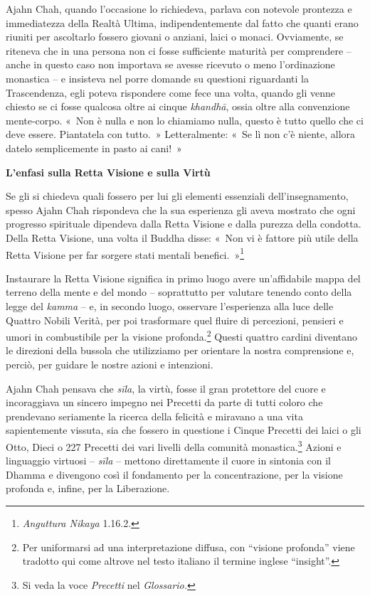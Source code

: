 Ajahn Chah, quando l'occasione lo richiedeva, parlava con notevole
prontezza e immediatezza della Realtà Ultima, indipendentemente dal
fatto che quanti erano riuniti per ascoltarlo fossero giovani o anziani,
laici o monaci. Ovviamente, se riteneva che in una persona non ci fosse
sufficiente maturità per comprendere -- anche in questo caso non
importava se avesse ricevuto o meno l'ordinazione monastica -- e
insisteva nel porre domande su questioni riguardanti la Trascendenza,
egli poteva rispondere come fece una volta, quando gli venne chiesto se
ci fosse qualcosa oltre ai cinque \emph{khandhā}, ossia oltre alla
convenzione mente-corpo. «~Non è nulla e non lo chiamiamo nulla, questo
è tutto quello che ci deve essere. Piantatela con tutto.~»
Letteralmente: «~Se lì non c'è niente, allora datelo semplicemente in
pasto ai cani!~»

\textbf{L'enfasi sulla Retta Visione e sulla Virtù}

Se gli si chiedeva quali fossero per lui gli elementi essenziali
dell'insegnamento, spesso Ajahn Chah rispondeva che la sua esperienza
gli aveva mostrato che ogni progresso spirituale dipendeva dalla Retta
Visione e dalla purezza della condotta. Della Retta Visione, una volta
il Buddha disse: «~Non vi è fattore più utile della Retta Visione per
far sorgere stati mentali benefici.~»\footnote{\emph{Anguttura Nikaya}
  1.16.2.}

Instaurare la Retta Visione significa in primo luogo avere un'affidabile
mappa del terreno della mente e del mondo -- soprattutto per valutare
tenendo conto della legge del \emph{kamma} -- e, in secondo luogo,
osservare l'esperienza alla luce delle Quattro Nobili Verità, per poi
trasformare quel fluire di percezioni, pensieri e umori in combustibile
per la visione profonda.\footnote{Per uniformarsi ad una interpretazione
  diffusa, con ``visione profonda'' viene tradotto qui come altrove nel
  testo italiano il termine inglese ``insight''.} Questi quattro cardini
diventano le direzioni della bussola che utilizziamo per orientare la
nostra comprensione e, perciò, per guidare le nostre azioni e
intenzioni.

Ajahn Chah pensava che \emph{sīla}, la virtù, fosse il gran protettore
del cuore e incoraggiava un sincero impegno nei Precetti da parte di
tutti coloro che prendevano seriamente la ricerca della felicità e
miravano a una vita sapientemente vissuta, sia che fossero in questione
i Cinque Precetti dei laici o gli Otto, Dieci o 227 Precetti dei vari
livelli della comunità monastica.\footnote{Si veda la voce
  \emph{Precetti} nel \emph{Glossario.}} Azioni e linguaggio virtuosi --
\emph{sīla} -- mettono direttamente il cuore in sintonia con il Dhamma e
divengono così il fondamento per la concentrazione, per la visione
profonda e, infine, per la Liberazione.


